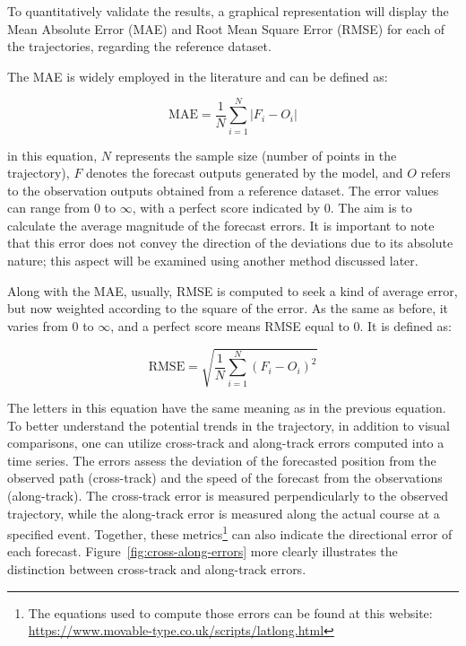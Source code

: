 To quantitatively validate the results, a graphical representation will display the Mean Absolute Error (MAE) and Root Mean Square Error (RMSE) for each of the trajectories, regarding the reference dataset.

The MAE is widely employed \cite{ditchek2023improving, nyongesa2024influence} in the literature and can be defined as:

\begin{equation}
    \text{MAE} = \frac{1}{N}\sum_{i=1}^{N} |F_i -O_i|
\end{equation}

\noindent in this equation, $N$ represents the sample size (number of points in the trajectory), $F$ denotes the forecast outputs generated by the model, and $O$ refers to the observation outputs obtained from a reference dataset. The error values can range from 0 to $\infty$, with a perfect score indicated by 0. The aim is to calculate the average magnitude of the forecast errors. It is important to note that this error does not convey the direction of the deviations due to its absolute nature; this aspect will be examined using another method discussed later.

Along with the MAE, usually, RMSE is computed to seek a kind of average error, but now weighted according to the square of the error. As the same as before, it varies from 0 to $\infty$, and a perfect score means RMSE equal to 0. It is defined as:

\begin{equation}
    \text{RMSE} = \sqrt{\frac{1}{N}\sum_{i=1}^{N} (F_i -O_i)^2}
\end{equation}

The letters in this equation have the same meaning as in the previous equation. To better understand the potential trends in the trajectory, in addition to visual comparisons, one can utilize cross-track and along-track errors computed into a time series. The errors assess the deviation of the forecasted position from the observed path (cross-track) and the speed of the forecast from the observations (along-track). The cross-track error is measured perpendicularly to the observed trajectory, while the along-track error is measured along the actual course at a specified event. Together, these metrics\footnote{The equations used to compute those errors can be found at this website: \url{https://www.movable-type.co.uk/scripts/latlong.html}} can also indicate the directional error of each forecast. Figure~\ref{fig:cross-along-errors} more clearly illustrates the distinction between cross-track and along-track errors. 

